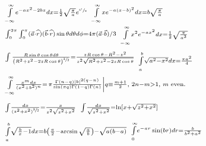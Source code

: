 \documentclass{article}
\newcommand{\YgorUD}[2]{\,\!^{#1}_{#2}}
\begin{document}
\begin{multicols}{2}
$\YgorUD{%
        \smash{\int\limits_{ - \infty}^{\infty}}   %
        e^{ - ax^{ 2} - 2bx}  dx = %
        \frac{1}{2} \sqrt{ \frac{\pi}{a}} e^{\sfrac{b^{2} }{a}}%
    }{%
        \,%
    }$\hfill\textbullet\hfill%
    $\YgorUD{%
        \smash{\int\limits_{ - \infty}^{\infty}}   %
        x e^{ - a(x - b)^{2}}  dx = b  \sqrt{ \frac{\pi}{a}}%
    }{%
        \,%
    }$


$\YgorUD{%
        \int_{0}^{2\pi}  \int_{0}^{\pi} %
         ( \vec{a}\cdot\widehat{r} ) ( \vec{b}\cdot\widehat{r} )%
        \sin\theta d\theta d\phi =4\pi ( \vec{a}\cdot\vec{b}) / 3%
    }{%
        \,%
    }$\hfill\textbullet\hfill%
    $\YgorUD{%
        \smash{\int\limits_{ - \infty}^{\infty}}   %
        x^{2} e^{ - ax^{2}}    dx = %
        \frac{1}{2}   \sqrt{  \frac{\pi}{a^{3}}}%
    }{%
        \,%
    }$

$\YgorUD{%
    \int    \frac{R \sin \theta \cos \theta d\theta}{\left( %
     R^{2}  +  z^{2}  -  2zR\cos \theta \right)^{ \sfrac{3 }{2}}} = %
    \frac{zR\cos \theta  -  R^{2}  -  z^{2}}{z^{2}  \sqrt{%
      R^{2}  +  z^{2}  -  2zR \cos \theta}}%
    }{%
        \,%
    }$\hfill\textbullet\hfill%
    $\YgorUD{%
        \smash{\int\limits_{ a}^{ b}}   %
        \sqrt{  a^{ 2} - x^{ 2}}dx = \frac{\pi a^{ 2}}{4}%
    }{%
        \,%
    }$

$\YgorUD{%
        \smash{\int\limits_{ - \infty}^{\infty}} %
          \frac{x^{m} dx}{( x^{2} + b^{2} )^{ n}} = %
        \left.\pi%
        \frac{%
           \Gamma( n - q ) | b |^{2( q - n )}%
        }{%
           \sin( \pi q ) \Gamma( 1 - q ) \Gamma( n )%
        }\right|%
        q\equiv \frac{m + 1}{2},\,\, 2n - m > 1,\,\,m \text{ even.}%
    }{%
        \,%
    }$

$\YgorUD{%
        \smash{\int}   \frac{dx}{( z^{2}  +  x^{2} )^{ \sfrac{3 }{2}}} =%
        \frac{x}{z^{2}  \sqrt{ z^{2}  +  x^{2}}}%
    }{%
        \,%
    }$\hfill\textbullet\hfill%
    $\YgorUD{%
        \smash{\int}   \frac{dx}{%
        \sqrt{z^{2} + x^{2}}} = %
        \ln\left[x  +  \smash{\sqrt{z^{2}  +  x^{2}}} \right]%
    }{%
        \,%
    }$

$\YgorUD{%
        \smash{\int\limits_{ a}^{ b}}   %
        \smash{\sqrt{  \frac{b}{x} - 1}}dx =%
        b\left( \frac{\pi}{2} - \arcsin \sqrt{ \frac{a}{b}}%
          \right) - \sqrt{ a( b - a )}%
    }{%
        \,%
    }$\hfill\textbullet\hfill%
    $\YgorUD{%
        \smash{\int\limits_{ 0}^{ \infty}}   %
        e^{ - ar}  \sin ( br )dr = \frac{b}{b^{2} + a^{2}}%
    }{%
        \,%
    }$


\end{multicols}
\end{document}
